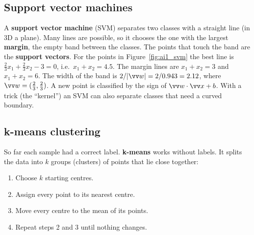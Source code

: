 \subsection*{Support vector machines}
A \textbf{support vector machine} (SVM) separates two classes with a straight line (in 3D a plane). Many lines are possible, so it chooses the one with the largest \textbf{margin}, the empty band between the classes. The points that touch the band are the \textbf{support vectors}. For the points in Figure~\ref{fig:ai1_svm} the best line is $\tfrac23x_1+\tfrac23x_2-3=0$, i.e.\ $x_1+x_2=4.5$. The margin lines are $x_1+x_2=3$ and $x_1+x_2=6$. The width of the band is $2/|\vv w|=2/0.943=2.12$, where $\vv w=(\frac23,\frac23)$. A new point is classified by the sign of $\vv w\cdot\vv x+b$. With a trick (the ``kernel'') an SVM can also separate classes that need a curved boundary.

\begin{center}
\label{fig:ai1_svm}
\end{center}

\subsection*{k-means clustering}
So far each sample had a correct label. \textbf{k-means} works without labels. It splits the data into $k$ groups (clusters) of points that lie close together:
\begin{enumerate}[nosep]
  \item Choose $k$ starting centres.
  \item Assign every point to its nearest centre.
  \item Move every centre to the mean of its points.
  \item Repeat steps 2 and 3 until nothing changes.
\end{enumerate}

